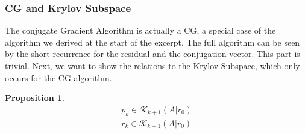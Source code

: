 \documentclass[]{article}
\theoremstyle{definition}
\newtheorem{prop}{Proposition}[section]  %
\begin{document}
        \subsubsection{CG and Krylov Subspace}\label{sec:CG_and_Krylov_Subspace}
            The conjugate Gradient Algorithm is actually a CG, a special case of the algorithm we derived at the start of the excerpt. The full algorithm can be seen by the short recurrence for the residual and the conjugation vector. This part is trivial. Next, we want to show the relations to the Krylov Subspace, which only occurs for the CG algorithm. 
            \begin{prop}
                \begin{align}
                    p_k \in \mathcal K_{k + 1}(A|r_0)
                    \\
                    r_k \in \mathcal K_{k + 1}(A|r_0)
                \end{align}    
            \end{prop}
\end{document}
